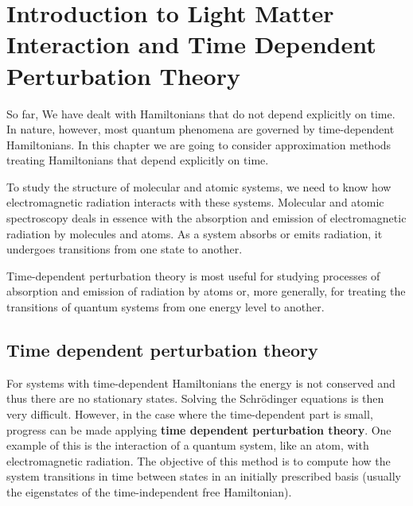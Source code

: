 \section{Introduction to Light Matter Interaction and Time Dependent Perturbation Theory}

So far, We have dealt with Hamiltonians that do not depend explicitly on time. In nature, however, most quantum phenomena are governed by time-dependent Hamiltonians. In this chapter we are going to consider approximation methods treating Hamiltonians that depend explicitly on time.

To study the structure of molecular and atomic systems, we need to know how electromagnetic radiation interacts with these systems. Molecular and atomic spectroscopy deals in essence with the absorption and emission of electromagnetic radiation by molecules and atoms. As a system absorbs or emits radiation, it undergoes transitions from one state to another. 

Time-dependent perturbation theory is most useful for studying processes of absorption and emission of radiation by atoms or, more generally, for treating the transitions of quantum systems from one energy level to another.

\subsection{Time dependent perturbation theory} \label{sec:time-dep-pert-thry}

For systems with time-dependent Hamiltonians the energy is not conserved and thus there are no stationary states. Solving the Schrödinger equations is then very difficult. However, in the case where the time-dependent part is small, progress can be made applying \textbf{time dependent perturbation theory}. One example of this is the interaction of a quantum system, like an atom, with electromagnetic radiation. The objective of this method is to compute how the system transitions in time between states in an initially prescribed basis (usually the eigenstates of the time-independent free Hamiltonian).

